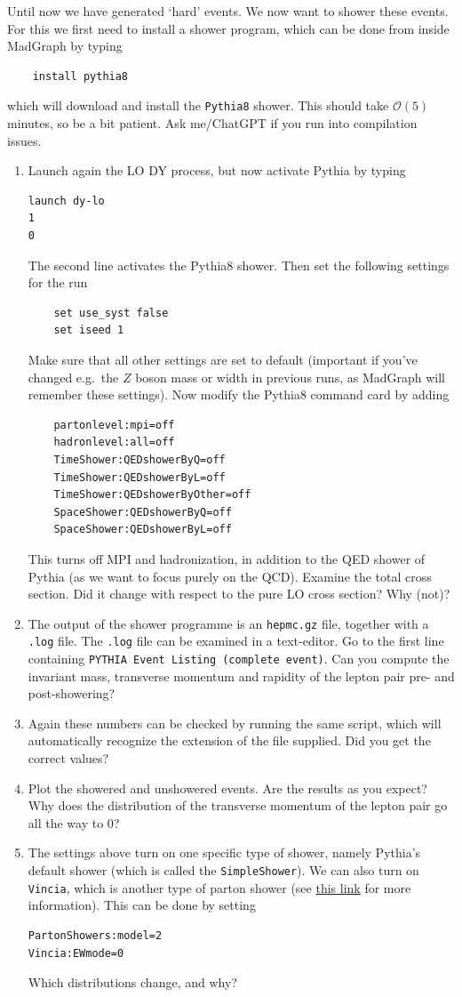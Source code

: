 \documentclass{article}
\begin{document}
Until now we have generated `hard' events. We now want to shower these events. For this we first need to install a shower program, which can be done from inside MadGraph by typing
\begin{verbatim}
	install pythia8
\end{verbatim}
which will download and install the \texttt{Pythia8} shower. 
%
This should take $\mathcal{O}(5)$ minutes, so be a bit patient. Ask me/ChatGPT if you run into compilation issues. 

\begin{enumerate}
\item Launch again the LO DY process, but now activate Pythia by typing
\begin{verbatim}
launch dy-lo
1
0
\end{verbatim}
The second line activates the Pythia8 shower. 
%
Then set the following settings for the run
\begin{verbatim}
	set use_syst false
	set iseed 1
\end{verbatim}
Make sure that all other settings are set to default (important if you've changed e.g.\ the $Z$ boson mass or width in previous runs, as MadGraph will remember these settings).
%
Now modify the Pythia8 command card by adding
\begin{verbatim}
	partonlevel:mpi=off
	hadronlevel:all=off
	TimeShower:QEDshowerByQ=off
	TimeShower:QEDshowerByL=off
	TimeShower:QEDshowerByOther=off
	SpaceShower:QEDshowerByQ=off
	SpaceShower:QEDshowerByL=off
\end{verbatim}
This turns off MPI and hadronization, in addition to the QED shower of Pythia (as we want to focus purely on the QCD). 
%
Examine the total cross section. Did it change with respect to the pure LO cross section? Why (not)?
\item The output of the shower programme is an \texttt{hepmc.gz} file, together with a \texttt{.log} file. The \texttt{.log} file can be examined in a text-editor. Go to the first line containing \texttt{PYTHIA Event Listing  (complete event)}. Can you compute the invariant mass, transverse momentum and rapidity of the lepton pair pre- and post-showering?
\item Again these numbers can be checked by running the same script, which will automatically recognize the extension of the file supplied. Did you get the correct values? 
\item Plot the showered and unshowered events. Are the results as you expect? Why does the distribution of the transverse momentum of the lepton pair go all the way to 0?
\item The settings above turn on one specific type of shower, namely Pythia's default shower (which is called the \texttt{SimpleShower}). We can also turn on \texttt{Vincia}, which is another type of parton shower (see \href{https://pythia.org/latest-manual/Vincia.html}{this link} for more information). This can be done by setting
\begin{verbatim}
PartonShowers:model=2
Vincia:EWmode=0
\end{verbatim}
Which distributions change, and why?
\end{enumerate}
	
\end{document}
